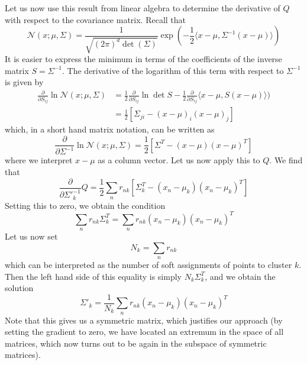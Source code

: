 \documentclass[a4paper, draft]{article}
\theoremstyle{own}
\theoremstyle{remark}
\begin{document}
Let us now use this result from linear algebra to determine the derivative of $Q$ with respect to the covariance matrix. Recall that
$$
{\mathcal N}(x ; \mu, \Sigma) = \frac{1}{\sqrt{(2\pi)^d \det(\Sigma)}}
\exp (-\frac{1}{2} \langle x - \mu, \Sigma^{-1}(x - \mu)\rangle)
$$
It is easier to express the minimum in terms of the coefficients of the inverse matrix $S = \Sigma^{-1}$. The derivative of the logarithm of this term with respect to $\Sigma^{-1}$ is given by
\begin{align*}
\frac{\partial}{\partial S_{ij}} \ln  {\mathcal N}(x ; \mu, \Sigma) 
& = \frac{1}{2} \frac{\partial}{\partial S_{ij}} \ln \det S
 - \frac{1}{2} \frac{\partial}{\partial S_{ij}} \langle x - \mu, S(x - \mu)\rangle) \\
&=  \frac{1}{2} \left[ 
\Sigma_{ji} 
-
(x - \mu)_i(x - \mu)_j
\right]
\end{align*}
which, in a short hand matrix notation, can be written as
$$
\frac{\partial}{\partial \Sigma^{-1}} \ln  {\mathcal N}(x ; \mu, \Sigma) 
= \frac{1}{2} \left[ 
\Sigma^T 
-
(x - \mu)(x - \mu)^T
\right]
$$
where we interpret $x - \mu$ as a column vector. 
Let us now apply this to $Q$. We find that
$$
\frac{\partial}{\partial \Sigma'^{-1}_k} Q 
= \frac{1}{2}
\sum_n  r_{nk}
\left[
\Sigma_k^T 
-
(x_n - \mu_k)(x_n - \mu_k)^T
\right] 
$$
Setting this to zero, we obtain the condition
$$
\sum_n  r_{nk} \Sigma_k^T = \sum_n  r_{nk} (x_n - \mu_k)(x_n - \mu_k)^T
$$
Let us now set
$$
N_k = \sum_n r_{nk}
$$
which can be interpreted as the number of soft assignments of points to cluster $k$. Then the left hand side of this equality is simply $N_k \Sigma_k^T$, and we obtain the solution
$$
\Sigma'_k = \frac{1}{N_k} \sum_n r_{nk} (x_n - \mu_k)(x_n - \mu_k)^T
$$
Note that this gives us a symmetric matrix, which justifies our approach (by setting the gradient to zero, we have located an extremum in the space of all matrices, which now turns out to be again in the subspace of symmetric matrices). 
\end{document}
